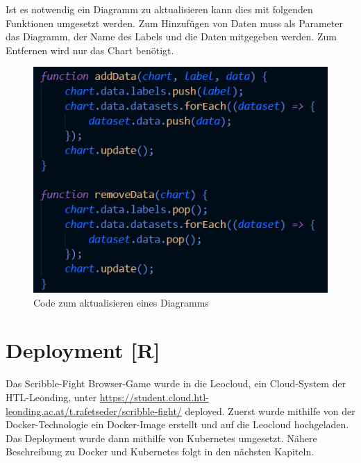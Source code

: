 Ist es notwendig ein Diagramm zu aktualisieren kann dies mit folgenden Funktionen umgesetzt werden. Zum Hinzufügen
von Daten muss als Parameter das Diagramm, der Name des Labels und die Daten mitgegeben werden. Zum Entfernen wird nur das Chart benötigt.
\begin{figure}[H]
  \centering
  \includegraphics[scale=1]{pics/updateChart.png}
  \caption{Code zum aktualisieren eines Diagramms}
\end{figure}




\section{Deployment [R]}
Das Scribble-Fight Browser-Game wurde in die Leocloud, ein Cloud-System der HTL-Leonding, unter \url{https://student.cloud.htl-leonding.ac.at/t.rafetseder/scribble-fight/} deployed.
Zuerst wurde mithilfe von der Docker-Technologie ein Docker-Image erstellt und auf die Leocloud hochgeladen. Das Deployment wurde dann mithilfe von Kubernetes umgesetzt.
Nähere Beschreibung zu Docker und Kubernetes folgt in den nächsten Kapiteln.
